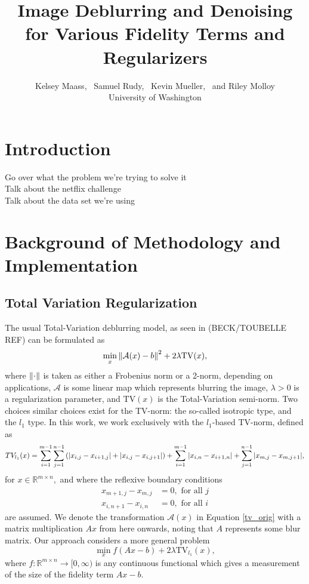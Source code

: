 \documentclass[10pt,a4paper]{article}
\newcommand{\R}{\mathbb{R}}
\begin{document}
\title{Image Deblurring and Denoising for Various Fidelity Terms and Regularizers}
\author{
Kelsey Maass, ~Samuel Rudy, ~Kevin Mueller, ~and Riley Molloy\\
University of Washington\\
}

\maketitle

\section{Introduction}
Go over what the problem we're trying to solve it\\
Talk about the netflix challenge\\
Talk about the data set we're using

\section{Background of Methodology and Implementation}


\subsection{Total Variation Regularization}
The usual Total-Variation deblurring model, as seen in (BECK/TOUBELLE REF) can be formulated as 
\begin{equation} \label{tv_orig}
\min_{x} \norm{ \mathcal{A}(x) - b }^2 + 2 \lambda \mathrm{TV}(x),
\end{equation}
where $\norm{\cdot}$ is taken as either a Frobenius norm or a 2-norm, depending on applications, $\mathcal{A}$ is some linear map which represents blurring the image, $\lambda>0$ is a regularization parameter, and $\mathrm{TV}(x)$ is the Total-Variation semi-norm. Two choices similar choices exist for the TV-norm: the so-called isotropic type, and the $l_1$ type. In this work, we work exclusively with the $l_1$-based TV-norm, defined as 
$$ TV_{l_1}(x) = \sum_{i=1}^{m-1} \sum_{j=1}^{n-1} \left( \abs{x_{i,j}  - x_{i+1,j} } + \abs{ x_{i,j} - x_{i,j+1}  } \right) + \sum_{i=1}^{m-1} \abs{ x_{i,n} - x_{i+1,n} } + \sum_{j=1}^{n-1} \abs{ x_{m,j} - x_{m,j+1 } },$$ for $x \in \R^{m \times n},$ and where the reflexive boundary conditions
\begin{align*}
x_{m+1,j} - x_{m,j} &= 0, \textrm{ for all }j \\
 x_{i,n+1} - x_{i,n} &= 0, \textrm{ for all }i
\end{align*}
are assumed. We denote the transformation $\mathcal{A}(x)$ in Equation \eqref{tv_orig} with a matrix multiplication $Ax$ from here onwards, noting that $A$ represents some blur matrix. Our approach considers a more general problem
\begin{equation} \label{tv_ours}
\min_{x} f(Ax - b ) + 2 \lambda \mathrm{TV}_{l_1}(x),
\end{equation}
where $f: \R^{m \times n} \rightarrow [0,\infty)$ is any continuous functional which gives a measurement of the size of the fidelity term $Ax-b.$
\end{document}
